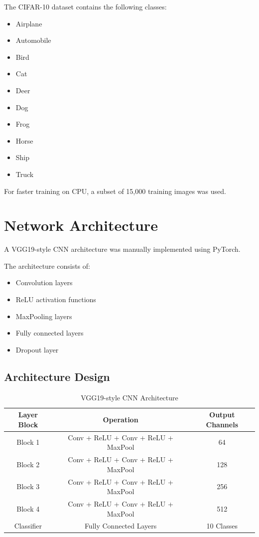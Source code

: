 \documentclass[12pt]{article}
\begin{document}
The CIFAR-10 dataset contains the following classes:

\begin{itemize}
    \item Airplane
    \item Automobile
    \item Bird
    \item Cat
    \item Deer
    \item Dog
    \item Frog
    \item Horse
    \item Ship
    \item Truck
\end{itemize}

For faster training on CPU, a subset of 15,000 training images was used.

\section{Network Architecture}

A VGG19-style CNN architecture was manually implemented using PyTorch.

The architecture consists of:

\begin{itemize}
    \item Convolution layers
    \item ReLU activation functions
    \item MaxPooling layers
    \item Fully connected layers
    \item Dropout layer
\end{itemize}

\subsection{Architecture Design}

\begin{table}[H]
\centering
\begin{tabular}{ccc}
\toprule
Layer Block & Operation & Output Channels \\
\midrule
Block 1 & Conv + ReLU + Conv + ReLU + MaxPool & 64 \\
Block 2 & Conv + ReLU + Conv + ReLU + MaxPool & 128 \\
Block 3 & Conv + ReLU + Conv + ReLU + MaxPool & 256 \\
Block 4 & Conv + ReLU + Conv + ReLU + MaxPool & 512 \\
Classifier & Fully Connected Layers & 10 Classes \\
\bottomrule
\end{tabular}
\caption{VGG19-style CNN Architecture}
\end{table}
\end{document}
